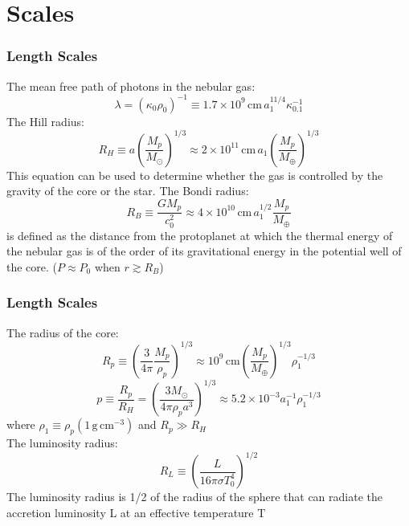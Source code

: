 \documentclass{beamer}
\begin{document}
\section{Scales}
\begin{frame}
\frametitle{Length Scales}
The mean free path of photons in the nebular gas:
\begin{equation}
\lambda = {(\kappa_0 \rho_0)}^{-1} \equiv 1.7 \times 10^9 \, \text{cm} \, a_1^{11/4} \kappa_{0.1}^{-1}
\end{equation}
The Hill radius:
\begin{equation}
R_H \equiv a \left( \frac{M_p}{M_\odot} \right)^{1/3} \approx 2 \times 10^{11} \, \text{cm} \, a_1 \left( \frac{M_p}{M_\oplus} \right)^{1/3}
\end{equation}
This equation can be used to determine whether the gas is controlled by the gravity of the core or the star.
The Bondi radius:
\begin{equation}
R_B \equiv \frac{G M_p}{c_0^2} \approx 4 \times 10^{10} \, \text{cm} \, a_1^{1/2} \frac{M_p}{M_\oplus}
\end{equation}
is defined as the distance from the protoplanet at which the thermal energy of the nebular gas is of the order of its gravitational energy in the potential well of the core. ($P \approx P_0$ when $r \gtrsim R_B$)
\end{frame}

\begin{frame}
\frametitle{Length Scales}
The radius of the core:
\begin{equation}
R_p \equiv \left( \frac{3}{4 \pi} \frac{M_p}{\rho_p} \right)^{1/3} \approx 10^9 \, \text{cm} \left( \frac{M_p}{M_\oplus} \right)^{1/3} \rho_1^{-1/3}
\end{equation}
\begin{equation}
p \equiv \frac{R_p}{R_H} = \left( \frac{3 M_\odot}{4 \pi \rho_p a^3} \right)^{1/3} \approx 5.2 \times 10^{-3} a_1^{-1} \rho_1^{-1/3} 
\end{equation}
where $\rho_1 \equiv \rho_p (1 \, \text{g} \, \text{cm}^{-3})$ and $R_p \gg R_H$\\
The luminosity radius:
\begin{equation}
R_L \equiv \left( \frac{L}{16 \pi \sigma T_0^4} \right)^{1/2}
\end{equation}
The luminosity radius is 1/2 of the radius of the sphere that can radiate the accretion luminosity L at an effective temperature T
\end{frame}
\end{document}
